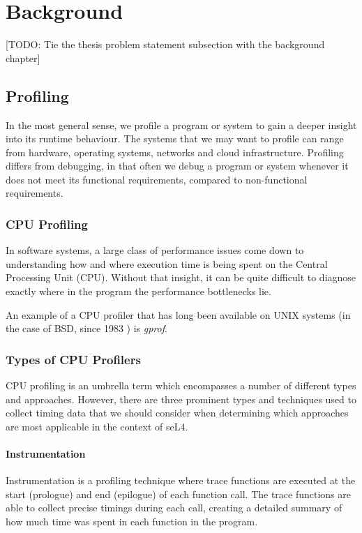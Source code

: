 \chapter{Background}\label{ch:background}

[TODO: Tie the thesis problem statement subsection with the background chapter]

\section{Profiling}

In the most general sense, we profile a program or system to gain a deeper insight into its runtime behaviour. The systems that we may want to profile can range from hardware, operating systems, networks and cloud infrastructure. Profiling differs from debugging, in that often we debug a program or system whenever it does not meet its functional requirements, compared to non-functional requirements.

\subsection{CPU Profiling}

In software systems, a large class of performance issues come down to understanding how and where execution time is being spent on the Central Processing Unit (CPU). Without that insight, it can be quite difficult to diagnose exactly where in the program the performance bottlenecks lie.

An example of a CPU profiler that has long been available on UNIX systems (in the case of BSD, since 1983 \cite{ManGprof}) is \textit{gprof}.

\subsection{Types of CPU Profilers}\label{sect:cpu_profiler_types}

CPU profiling is an umbrella term which encompasses a number of different types and approaches. However, there are three prominent types and techniques used to collect timing data that we should consider when determining which approaches are most applicable in the context of seL4.

\subsubsection{Instrumentation}

Instrumentation is a profiling technique where trace functions are executed at the start (prologue) and end (epilogue) of each function call. The trace functions are able to collect precise timings during each call, creating a detailed summary of how much time was spent in each function in the program.

